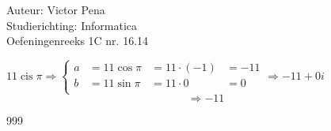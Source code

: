 \documentclass[a4paper]{article}
\begin{document}
	
\newcommand{\cis}{\operatorname{cis}}
	
\noindent \large Auteur: Victor Pena \\
\noindent \large Studierichting: Informatica\\
\noindent \large Oefeningenreeks 1C nr. 16.14\\

\medskip

\normalsize

$11\cis\pi \Rightarrow 
\left\{\begin{array}{llll}
	a &= 11\cos\pi &= 11\cdot(-1) &= -11\\
	b &= 11\sin\pi &= 11\cdot0  &= 0\\
\end{array}\right.
\Rightarrow -11 + 0i$\\

$$\Rightarrow -11$$


	
\begin{thebibliography}{999}
\end{thebibliography}
\end{document}
